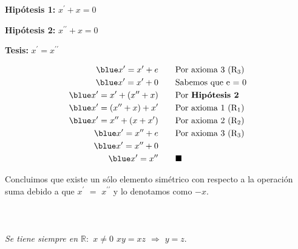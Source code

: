 \documentclass[12pt]{article}
\renewcommand{\qedsymbol}{$\blacksquare$}
\begin{document}
\begin{center}
    {{\textbf{Hipótesis 1:}}} $x^{\prime} + x = 0$
\end{center}

\begin{center}
{{\textbf{Hipótesis 2:}}} $x^{{\prime}{\prime}} + x = 0$
\end{center}

\begin{center}
    {{\textbf{Tesis:}}} $ x^{\prime} = x^{{\prime}{\prime}}$
\end{center}



{}
\begin{align*}
\blue
  x^{\prime} =  x^{\prime} + e & \qquad \textup{Por axioma 3 (R$_3$)}\\
  \blue
  x^{\prime} =  x^{\prime} + 0 & \qquad \textup{Sabemos que e = 0}\\
  \blue
  x^{\prime} =  x^{\prime} + (x^{{\prime}{\prime}}+x) & \qquad \textup{Por \textbf{Hipótesis 2}}\\
  \blue
 x^{\prime} =  (x^{{\prime}{\prime}}+x)+x^{\prime} & \qquad \textup{Por axioma 1 (R$_1$)}\\
 \blue
  x^{\prime} = x^{{\prime}{\prime}}+(x+x^{\prime}) & \qquad \textup{Por axioma 2 (R$_2$)}\\
  \blue
  x^{\prime} =  x^{{\prime}{\prime}} + e & \qquad \textup{Por axioma 3 (R$_3$)}\\
  \blue
  x^{\prime} =  x^{{\prime}{\prime}} + 0 & \qquad \\
  \blue
  x^{\prime} =  x^{{\prime}{\prime}} & \qquad \textup{\qedsymbol}\\
\end{align*}

Concluimos que existe un sólo elemento simétrico con respecto a la operación suma debido a que $x^{\prime}$ $=$ $x^{{\prime}{\prime}}$ y lo denotamos como $-x$. 
\newpage
\section*{{}}\\
{\textit{Se tiene siempre en $\mathbb{R}:$ $ x\neq 0 $ $ xy = xz$ $\Rightarrow$ $y=z$}}.\\

{} \\
\end{document}

